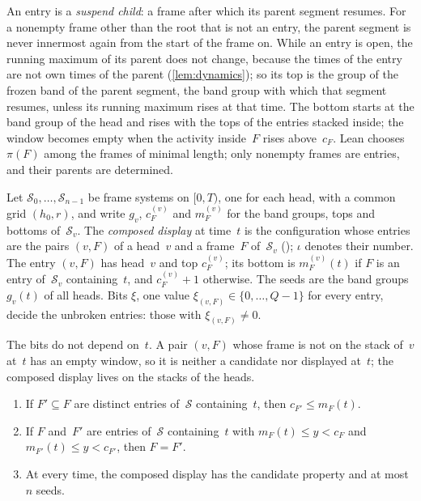 An entry is a \emph{suspend child}: a frame after which its parent segment resumes. For a nonempty frame other than the root that
is not an entry, the parent segment is never innermost again from the start of the frame on. While an entry is open, the running
maximum of its parent does not change, because the times of the entry are not own times of the parent (\cref{lem:dynamics}); so its
top is the group of the frozen band of the parent segment, the band group with which that segment resumes, unless its running
maximum rises at that time. The
bottom starts at the band group of the head and rises with the tops of the entries stacked inside; the window becomes empty when
the activity inside~$F$ rises above~$c_F$. Lean chooses $\pi(F)$ among the frames of minimal length; only nonempty frames are
entries, and their parents are determined.

\begin{definition}\label{def:composed}
Let $\mathcal S_0,\dots,\mathcal S_{n-1}$ be frame systems on $[0,T)$, one for each head, with a common grid $(h_0,r)$, and write $g_v$, $c^{(v)}_F$
and $m^{(v)}_F$ for the band groups, tops and bottoms of~$\mathcal S_v$. The \emph{composed display} at time~$t$ is the configuration whose
entries are the pairs $(v,F)$ of a head~$v$ and a frame~$F$ of~$\mathcal S_v$ (); $\iota$ denotes their number. The entry
$(v,F)$ has head~$v$ and top $c^{(v)}_F$; its bottom is $m^{(v)}_F(t)$ if $F$ is an entry of~$\mathcal S_v$ containing~$t$, and $c^{(v)}_F+1$
otherwise. The seeds are the band groups $g_v(t)$ of all heads. Bits $\xi$, one value $\xi_{(v,F)}\in\{0,\dots,Q-1\}$ for every
entry, decide the unbroken entries: those with $\xi_{(v,F)}\ne0$.
\end{definition}

The bits do not depend on~$t$. A pair $(v,F)$ whose frame is not on the stack of~$v$ at~$t$ has an empty window, so it is neither a
candidate nor displayed at~$t$; the composed display lives on the stacks of the heads.

\begin{lemma}\label{lem:onecandidate}
\begin{enumerate}[label=(\alph*)]
\item If $F'\subseteq F$ are distinct entries of~$\mathcal S$ containing~$t$, then $c_{F'}\le m_F(t)$.
\item If $F$ and~$F'$ are entries of~$\mathcal S$ containing~$t$ with $m_F(t)\le y<c_F$ and $m_{F'}(t)\le y<c_{F'}$, then $F=F'$.
\item At every time, the composed display has the candidate property and at most $n$ seeds.
\end{enumerate}
\end{lemma}

